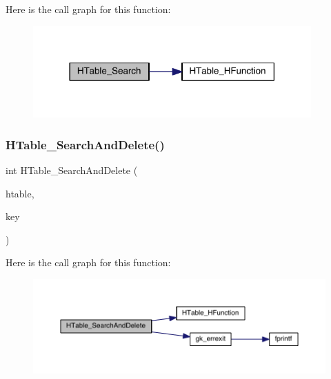 Here is the call graph for this function\+:\nopagebreak
\begin{figure}[H]
\begin{center}
\leavevmode
\includegraphics[width=302pt]{a00077_a2b610fbd6017e0ef2e393c563b4809a5_cgraph}
\end{center}
\end{figure}
\mbox{\label{a00077_acb372a5e2569817f3a10cbeababda100}} 
\subsubsection{\texorpdfstring{H\+Table\+\_\+\+Search\+And\+Delete()}{HTable\_SearchAndDelete()}}
{\footnotesize\ttfamily int H\+Table\+\_\+\+Search\+And\+Delete (\begin{DoxyParamCaption}\item[{\hyperlink{a00650}{gk\+\_\+\+H\+Table\+\_\+t} $\ast$}]{htable,  }\item[{int}]{key }\end{DoxyParamCaption})}

Here is the call graph for this function\+:\nopagebreak
\begin{figure}[H]
\begin{center}
\leavevmode
\includegraphics[width=350pt]{a00077_acb372a5e2569817f3a10cbeababda100_cgraph}
\end{center}
\end{figure}
\mbox{\label{a00077_af6a3613a1eb4247a2f419c194df7f5df}} 
